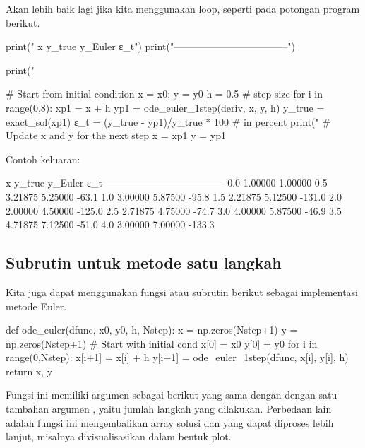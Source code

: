 Akan lebih baik lagi jika kita menggunakan loop, seperti pada potongan
program berikut.
\begin{pythoncode}
print("   x     y_true   y_Euler       ε_t")
print("-----------------------------------")

print("%

# Start from initial condition
x = x0; y = y0
h = 0.5 # step size
for i in range(0,8):
    xp1 = x + h
    yp1 = ode_euler_1step(deriv, x, y, h)
    y_true = exact_sol(xp1)
    ε_t = (y_true - yp1)/y_true * 100 # in percent
    print("%
    # Update x and y for the next step
    x = xp1
    y = yp1
\end{pythoncode}

Contoh keluaran:
\begin{textcode}
   x     y_true   y_Euler       ε_t 
------------------------------------
  0.0   1.00000   1.00000
  0.5   3.21875   5.25000     -63.1%
  1.0   3.00000   5.87500     -95.8%
  1.5   2.21875   5.12500    -131.0%
  2.0   2.00000   4.50000    -125.0%
  2.5   2.71875   4.75000     -74.7%
  3.0   4.00000   5.87500     -46.9%
  3.5   4.71875   7.12500     -51.0%
  4.0   3.00000   7.00000    -133.3%
\end{textcode}


%





\subsection*{Subrutin untuk metode satu langkah}
Kita juga dapat menggunakan fungsi atau subrutin berikut sebagai implementasi
metode Euler.
\begin{pythoncode}
def ode_euler(dfunc, x0, y0, h, Nstep):
    x = np.zeros(Nstep+1)
    y = np.zeros(Nstep+1)
    # Start with initial cond
    x[0] = x0
    y[0] = y0
    for i in range(0,Nstep):
        x[i+1] = x[i] + h
        y[i+1] = ode_euler_1step(dfunc, x[i], y[i], h)
    return x, y
\end{pythoncode}
Fungsi ini memiliki argumen sebagai berikut yang sama dengan 
dengan satu tambahan argumen , yaitu jumlah langkah yang dilakukan.
Perbedaan lain adalah fungsi ini mengembalikan array solusi  dan 
yang dapat diproses lebih lanjut, misalnya divisualisasikan dalam bentuk plot.


